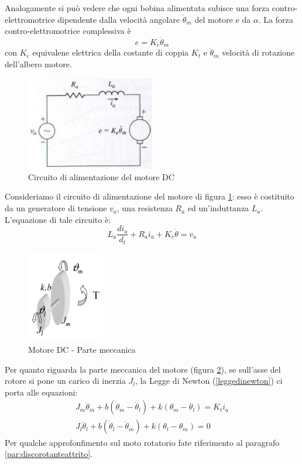 \documentclass[a4paper]{report}
\begin{document}
Analogamente si pu\`o vedere che ogni bobina alimentata subisce una
forza contro-elettromotrice dipendente dalla velocit\`a angolare
$\dot{\theta}_m$ del motore e da $\alpha$. La forza
contro-elettromotrice complessiva \`e
\[
  e = K_e \dot{\theta}_m
\]
con $K_e$ equivalene elettrica della costante di coppia $K_t$ e
$\dot{\theta}_m$ velocit\`a di rotazione dell'albero motore.
\begin{figure}[!t]
\centering
\includegraphics[width=0.5\textwidth]{./images/motoreDC04.png}
\caption{Circuito di alimentazione del motore DC\label{fig:motoreDC04}}
\end{figure}
Consideriamo il circuito di alimentazione del motore di figura
\ref{fig:motoreDC04}: esso \`e costituito da un generatore di tensione
$v_a$, una resistenza $R_a$ ed un'induttanza $L_a$. L'equazione di
tale circuito \`e:
\[
  L_a \dfrac{di_a}{d_t} + R_a i_a + K_e \dot{\theta} = v_a
\]
\begin{figure}[!b]
\centering
\includegraphics[width=0.3\textwidth]{./images/motoreDC05.png}
\caption{Motore DC - Parte meccanica\label{fig:motoreDC05}}
\end{figure}
Per quanto riguarda la parte meccanica del motore (figura
\ref{fig:motoreDC05}), se sull'asse del rotore si pone un carico di
inerzia $J_l$, la Legge di Newton (\ref{leggedinewton}) ci porta alle equazioni:
\[
  \begin{array}{l}
    J_m \ddot{\theta}_m + b( \dot{\theta}_m - \dot{\theta}_l) + k
    (\theta_m - \theta_l) = K_t i_a\\
    J_l \ddot{\theta}_l + b( \dot{\theta}_l - \dot{\theta}_m) + k
    (\theta_l - \theta_m) = 0
  \end{array}
\]
Per qualche approfonfimento sul moto rotatorio fate riferimento al
paragrafo \ref{par:discorotanteattrito}.
\end{document}

